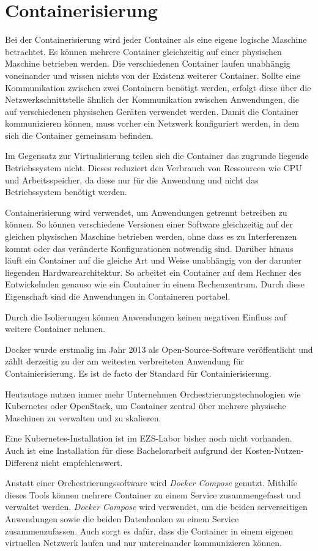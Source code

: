 \section{Containerisierung} \label{sec:Containerisierung}
Bei der Containerisierung wird jeder Container als eine eigene logische Maschine betrachtet. Es können mehrere Container gleichzeitig auf einer physischen Maschine betrieben werden. 
Die verschiedenen Container laufen unabhängig voneinander und wissen nichts von der Existenz weiterer Container. Sollte eine Kommunikation zwischen zwei Containern benötigt werden, erfolgt diese über die Netzwerkschnittstelle ähnlich der Kommunikation zwischen Anwendungen, die auf verschiedenen physischen Geräten verwendet werden. \cite{boersmaContainerizationDefinitionBest2019} Damit die Container kommunizieren können, muss vorher ein Netzwerk konfiguriert werden, in dem sich die Container gemeinsam befinden.

Im Gegensatz zur Virtualisierung teilen sich die Container das zugrunde liegende Betriebssystem nicht. Dieses reduziert den Verbrauch von Ressourcen wie CPU und Arbeitsspeicher, da diese nur für die Anwendung und nicht das Betriebssystem benötigt werden.

Containerisierung wird verwendet, um Anwendungen getrennt betreiben zu können. So können verschiedene Versionen einer Software gleichzeitig auf der gleichen physischen Maschine betrieben werden, ohne dass es zu Interferenzen kommt oder das veränderte Konfigurationen notwendig sind. Darüber hinaus läuft ein Container auf die gleiche Art und Weise unabhängig von der darunter liegenden Hardwarearchitektur. So arbeitet ein Container auf dem Rechner des Entwickelnden genauso wie ein Container in einem Rechenzentrum. Durch diese Eigenschaft sind die Anwendungen in Containeren portabel. \cite{boersmaContainerizationDefinitionBest2019}

Durch die Isolierungen können Anwendungen keinen negativen Einfluss auf weitere Container nehmen.

Docker wurde erstmalig im Jahr 2013 als Open-Source-Software veröffentlicht und zählt derzeitig zu der am weitesten verbreiteten Anwendung für Containierisierung. Es ist de facto der Standard für Containierisierung. \cite{boersmaContainerizationDefinitionBest2019}

Heutzutage nutzen immer mehr Unternehmen Orchestrierungstechnologien wie Kubernetes oder OpenStack, um Container zentral über mehrere physische Maschinen zu verwalten und zu skalieren.
\cite{gaviganHistoryAngular2018}

Eine Kubernetes-Installation ist im EZS-Labor bisher noch nicht vorhanden. Auch ist eine Installation für diese Bachelorarbeit aufgrund der Kosten-Nutzen-Differenz nicht empfehlenswert.

Anstatt einer Orchestrierungssoftware wird \textit{Docker Compose} genutzt.
Mithilfe dieses Tools können mehrere Container zu einem Service zusammengefasst und verwaltet werden. \textit{Docker Compose} wird verwendet, um die beiden serverseitigen Anwendungen sowie die beiden Datenbanken zu einem Service zusammenzufassen. Auch sorgt es dafür, dass die Container in einem eigenen virtuellen Netzwerk laufen und nur untereinander kommunizieren können. \cite{dockerinc.OverviewDockerCompose2020} 